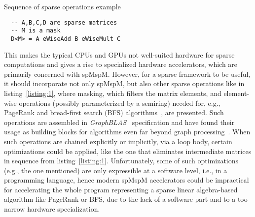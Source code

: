 \documentclass[sigplan,review,anonymous,nonacm]{acmart}\settopmatter{printfolios=true,printccs=false,printacmref=false}
\begin{document}
\begin{listing}
  \caption{Sequence of sparse operations example}
\label{listing:1}

\begin{verbatim}
  -- A,B,C,D are sparse matrices
  -- M is a mask
  D<M> = A eWiseAdd B eWiseMult C
\end{verbatim}

\end{listing}

This makes the typical CPUs and GPUs not well-suited hardware for sparse computations and gives a rise to specialized hardware accelerators, which are primarily concerned with spMspM.
However, for a sparse framework to be useful, it should incorporate not only spMspM, but also other sparse operations like in listing~\ref{listing:1}, where masking, which filters the matrix elements, and element-wise operations (possibly parameterized by a semiring) needed for, e.g., PageRank and bread-first search (BFS) algorithms~\cite{yang2020graphblast},  are presented.
Such operations are assembled in \emph{GraphBLAS}~\cite{buluc2017graphblas} specification and have found their usage as building blocks for algorithms even far beyond graph processing~\cite{compBio,Kepner_2017,GAILLA}.
When such operations are chained explicitly or implicitly, via a loop body, certain optimizations could be applied, like the one that eliminates intermediate matrices in sequence from listing~\ref{listing:1}.
Unfortunately, some of such optimizations (e.g., the one mentioned) are only expressible at a software level, i.e., in a programming language, hence modern spMspM accelerators could be impractical for accelerating the whole program representing a sparse linear algebra-based algorithm like PageRank or BFS, due to the lack of a software part and to a too narrow hardware specialization.
\end{document}
